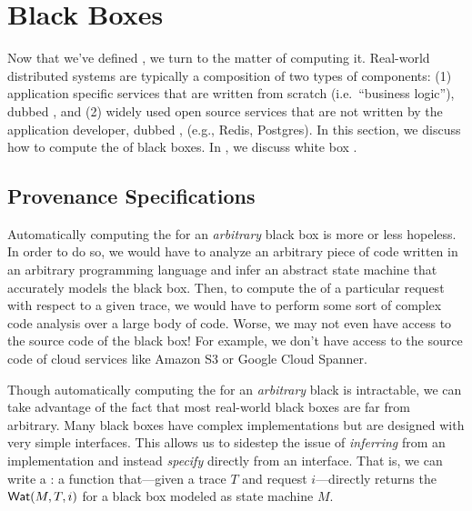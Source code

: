 \section{Black Boxes}
Now that we've defined \watprovenance{}, we turn to the matter of computing it.
Real-world distributed systems are typically a composition of two types of
components: (1) application specific services that are written from scratch
(i.e.\ ``business logic''), dubbed , and (2) widely used
open source services that are not written by the application developer, dubbed
, (e.g., Redis, Postgres). In this section, we discuss how
to compute the \watprovenance{} of black boxes. In , we
discuss white box \watprovenance{}.

\subsection{Provenance Specifications}
Automatically computing the \watprovenance{} for an \emph{arbitrary} black box
is more or less hopeless. In order to do so, we would have to analyze an
arbitrary piece of code written in an arbitrary programming language and infer
an abstract state machine that accurately models the black box. Then, to
compute the \watprovenance{} of a particular request with respect to a given
trace, we would have to perform some sort of complex code analysis over a large
body of code. Worse, we may not even have access to the source code of the
black box!  For example, we don't have access to the source code of cloud
services like Amazon S3 or Google Cloud Spanner.

\newcommand{\kvget}{\texttt{get}}
\newcommand{\kvset}{\texttt{set}}

Though automatically computing the \watprovenance{} for an \emph{arbitrary}
black is intractable, we can take advantage of the fact that most real-world
black boxes are far from arbitrary. Many black boxes have complex
implementations but are designed with very simple interfaces.  This allows us
to sidestep the issue of \emph{inferring} \watprovenance{} from an
implementation and instead \emph{specify} \watprovenance{} directly from an
interface. That is, we can write a : a
function that---given a trace $T$ and request $i$---directly returns the
\watprovenance{} $\textsf{Wat}(M, T, i)$ for a black box modeled as state machine $M$.

